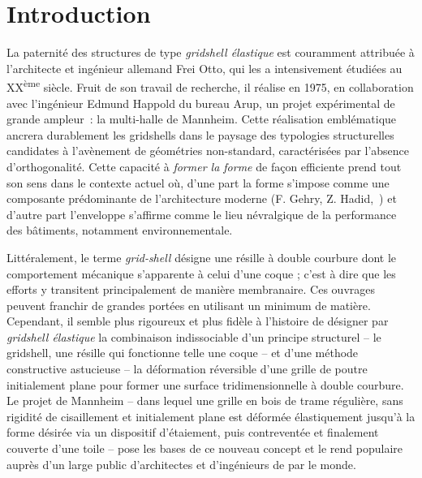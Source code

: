 





\chapter*{Introduction}\label{chp:intro}


La paternité des structures de type \emph{gridshell élastique} est couramment attribuée à l'architecte et ingénieur allemand Frei Otto, qui les a intensivement étudiées au XX\textsuperscript{ème} siècle. Fruit de son travail de recherche, il réalise en 1975, en collaboration avec l'ingénieur Edmund Happold du bureau Arup, un projet expérimental de grande ampleur~: la multi-halle de Mannheim. Cette réalisation emblématique ancrera durablement les gridshells dans le paysage des typologies structurelles candidates à l'avènement de géométries non-standard, caractérisées par l'absence d'orthogonalité. Cette capacité à \emph{former la forme} de façon efficiente prend tout son sens dans le contexte actuel où, d'une part la forme s'impose comme une composante prédominante de l'architecture moderne (F. Gehry, Z. Hadid,~\telp{}) et d'autre part l'enveloppe s'affirme comme le lieu névralgique de la performance des bâtiments, notamment environnementale.

Littéralement, le terme \emph{grid-shell} désigne une résille à double courbure dont le comportement mécanique s'apparente à celui d'une coque ; c'est à dire que les efforts y transitent principalement de manière membranaire. Ces ouvrages peuvent franchir de grandes portées en utilisant un minimum de matière. Cependant, il semble plus rigoureux et plus fidèle à l'histoire de désigner par \emph{gridshell élastique} la combinaison indissociable d'un principe structurel -- le gridshell, une résille qui fonctionne telle une coque -- et d'une méthode constructive astucieuse -- la déformation réversible d'une grille de poutre initialement plane pour former une surface tridimensionnelle à double courbure. Le projet de Mannheim -- dans lequel une grille en bois de trame régulière, sans rigidité de cisaillement et initialement plane est déformée élastiquement jusqu'à la forme désirée via un dispositif d'étaiement, puis contreventée et finalement couverte d'une toile -- pose les bases de ce nouveau concept et le rend populaire auprès d'un large public d'architectes et d'ingénieurs de par le monde.

